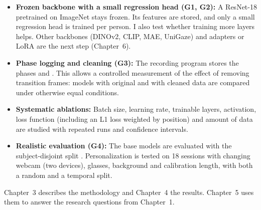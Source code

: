 \begin{itemize}
  \item \textbf{Frozen backbone with a small regression head (G1, G2):} A
        ResNet-18 pretrained on ImageNet stays frozen. Its features are stored,
        and only a small regression head is trained per person. I also test whether
        training more layers helps. Other backbones (DINOv2, CLIP, MAE,
        UniGaze) and adapters or LoRA are the next step (Chapter~6).
  \item \textbf{Phase logging and cleaning (G3):} The recording program stores
        the phases  and . This allows a controlled
        measurement of the effect of removing transition frames: models with
        original and with cleaned data are compared under otherwise equal
        conditions.
  \item \textbf{Systematic ablations:} Batch size, learning rate, trainable
        layers, activation, loss function (including an L1 loss weighted by
        position) and amount of data are studied with repeated runs and
        confidence intervals.
  \item \textbf{Realistic evaluation (G4):} The base models are evaluated with
        the subject-disjoint split . Personalization is
        tested on 18 sessions with changing webcam (two devices), glasses,
        background and calibration length, with both a random and a temporal
        split.
\end{itemize}

Chapter~3 describes the methodology and Chapter~4 the results. Chapter~5 uses
them to answer the research questions from Chapter~1.

